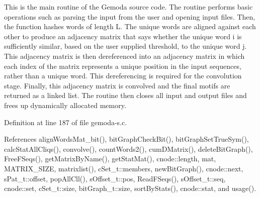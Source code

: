 This is the main routine of the Gemoda source code. The routine performs basic operations such as parsing the input from the user and opening input files. Then, the function hashes words of length L. The unique words are aligned against each other to produce an adjacency matrix that says whether the unique word i is sufficiently similar, based on the user supplied threshold, to the unique word j. This adjacency matrix is then dereferenced into an adjacency matrix in which each index of the matrix represents a unique position in the input sequences, rather than a unique word. This dereferencing is required for the convolution stage. Finally, this adjacency matrix is convolved and the final motifs are returned as a linked list. The routine then closes all input and output files and frees up dynamically allocated memory.

Definition at line 187 of file gemoda-s.c.

References align\-Words\-Mat\_\-bit(), bit\-Graph\-Check\-Bit(), bit\-Graph\-Set\-True\-Sym(), calc\-Stat\-All\-Cliqs(), convolve(), count\-Words2(), cum\-DMatrix(), delete\-Bit\-Graph(), Free\-FSeqs(), get\-Matrix\-By\-Name(), get\-Stat\-Mat(), cnode::length, mat, MATRIX\_\-SIZE, matrixlist(), c\-Set\_\-t::members, new\-Bit\-Graph(), cnode::next, s\-Pat\_\-t::offset, pop\-All\-Cll(), s\-Offset\_\-t::pos, Read\-FSeqs(), s\-Offset\_\-t::seq, cnode::set, c\-Set\_\-t::size, bit\-Graph\_\-t::size, sort\-By\-Stats(), cnode::stat, and usage().

